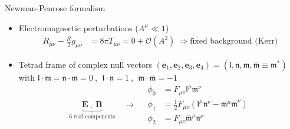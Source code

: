 \documentclass[9pt,serif,mathserif]{beamer}
\begin{document}
\begin{frame}{Newman-Penrose formalism}    
    \begin{itemize}
        \setlength\itemsep{1.5em}
        \item Electromagnectic perturbations ($A^\mu \ll 1$)
        \begin{align*}
            R_{\mu\nu} - \frac{R}{2} g_{\mu\nu} &= 8 \pi T_{\mu\nu} = 0 + \mathcal{O}(A^2) ~\Rightarrow\text{fixed background (Kerr)}
        \end{align*}

        \item Tetrad frame of complex null vectors $(\bm{e}_1,\bm{e}_2,\bm{e}_3,\bm{e}_4)
        = (\bm{\mathfrak{l}},\bm{\mathfrak{n}},\bm{\mathfrak{m}},\bar{\bm{\mathfrak{m}}}\equiv \bm{\mathfrak{m}}^*)$
        with $\bm{\mathfrak{l}}\cdot\bm{\mathfrak{m}} = \bm{\mathfrak{n}}\cdot\bm{\mathfrak{m}} = 0 ~,~~ \bm{\mathfrak{l}}\cdot\bm{\mathfrak{n}} = 1 ~,~~ \bm{\mathfrak{m}}\cdot\bar{\bm{\mathfrak{m}}} = -1$
        \begin{equation*}
            \underbrace{\mathbf{E} ~,~ \mathbf{B}}_\text{6 real components}
            \quad\longrightarrow\quad
            \boxed{
            \begin{aligned}
                \phi_0 &= F_{\mu\nu} \mathfrak{l}^\mu \mathfrak{m}^\nu \\
                \phi_1 &= \tfrac{1}{2} F_{\mu\nu} ( \mathfrak{l}^\mu \mathfrak{n}^\nu - \mathfrak{m}^\mu \bar{\mathfrak{m}}^\nu ) \\
                \phi_2 &= F_{\mu\nu} \bar{\mathfrak{m}}^\mu \mathfrak{n}^\nu 
            \end{aligned}
            }
        \end{equation*}


\end{itemize}
\end{frame}
\end{document}
